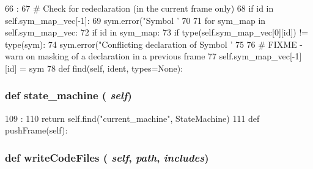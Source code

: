 \begin{DoxyCode}
66                                   :
67         # Check for redeclaration (in the current frame only)
68         if id in self.sym_map_vec[-1]:
69             sym.error("Symbol '%
70 
71         for sym_map in self.sym_map_vec:
72             if id in sym_map:
73                 if type(self.sym_map_vec[0][id]) != type(sym):
74                     sym.error("Conflicting declaration of Symbol '%
75 
76         # FIXME - warn on masking of a declaration in a previous frame
77         self.sym_map_vec[-1][id] = sym
78 
    def find(self, ident, types=None):
\end{DoxyCode}
\hypertarget{classslicc_1_1symbols_1_1SymbolTable_1_1SymbolTable_ac4db0fc2cd33768643738f7f9d8bec5e}{
\subsubsection[{state\_\-machine}]{\setlength{\rightskip}{0pt plus 5cm}def state\_\-machine ( {\em self})}}
\label{classslicc_1_1symbols_1_1SymbolTable_1_1SymbolTable_ac4db0fc2cd33768643738f7f9d8bec5e}



\begin{DoxyCode}
109                            :
110         return self.find("current_machine", StateMachine)
111 
    def pushFrame(self):
\end{DoxyCode}
\hypertarget{classslicc_1_1symbols_1_1SymbolTable_1_1SymbolTable_a69d0582bde832d4ff45237ab5ff116bb}{
\subsubsection[{writeCodeFiles}]{\setlength{\rightskip}{0pt plus 5cm}def writeCodeFiles ( {\em self}, \/   {\em path}, \/   {\em includes})}}
\label{classslicc_1_1symbols_1_1SymbolTable_1_1SymbolTable_a69d0582bde832d4ff45237ab5ff116bb}



